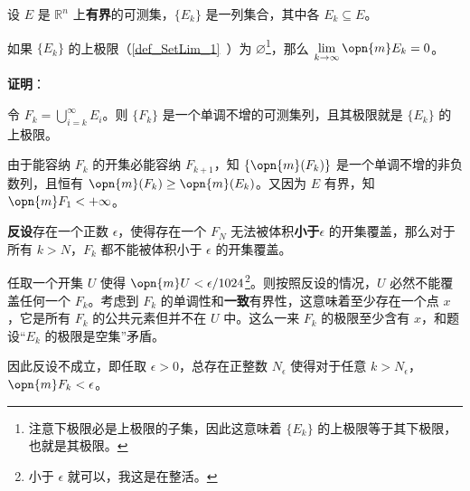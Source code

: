 



\begin{lemma}{}\label{lem_EgrfTh_1}
设 $E$ 是 $\mathbb{R}^n$ 上\textbf{有界}的可测集，$\{E_k\}$ 是一列集合，其中各 $E_k\subseteq E$。

如果 $\{E_k\}$ 的上极限（\autoref{def_SetLim_1}~）为 $\varnothing$\footnote{注意下极限必是上极限的子集，因此这意味着 $\{E_k\}$ 的上极限等于其下极限，也就是其极限。}，那么 $\lim\limits_{k\to\infty}\opn{m}E_k=0$。
\end{lemma}

\textbf{证明}：

令 $F_k=\bigcup_{i=k}^\infty E_i$。则 $\{F_k\}$ 是一个单调不增的可测集列，且其极限就是 $\{E_k\}$ 的上极限。

由于能容纳 $F_k$ 的开集必能容纳 $F_{k+1}$，知 $\{\opn{m}(F_k)\}$ 是一个单调不增的非负数列，且恒有 $\opn{m}(F_k)\geq\opn{m}(E_k)$。又因为 $E$ 有界，知 $\opn{m}F_1<+\infty$。

\textbf{反设}存在一个正数 $\epsilon$，使得存在一个 $F_N$ 无法被体积\textbf{小于}$\epsilon$ 的开集覆盖，那么对于所有 $k>N$，$F_k$ 都不能被体积小于 $\epsilon$ 的开集覆盖。

任取一个开集 $U$ 使得 $\opn{m}U<\epsilon/1024$\footnote{小于 $\epsilon$ 就可以，我这是在整活。}。则按照反设的情况，$U$ 必然不能覆盖任何一个 $F_k$。考虑到 $F_k$ 的单调性和\textbf{一致}有界性，这意味着至少存在一个点 $x$，它是所有 $F_k$ 的公共元素但并不在 $U$ 中。这么一来 $F_k$ 的极限至少含有 $x$，和题设“$E_k$ 的极限是空集”矛盾。

因此反设不成立，即任取 $\epsilon>0$，总存在正整数 $N_\epsilon$ 使得对于任意 $k>N_\epsilon$，$\opn{m}F_k<\epsilon$。

